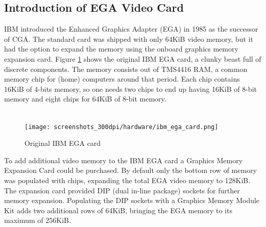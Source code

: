 \documentclass[book.tex]{subfiles}
\begin{document}
\subsection{Introduction of EGA Video Card}

IBM introduced the Enhanced Graphics Adapter (EGA) in 1985 as the successor of CGA. The standard card was shipped with only 64KiB video memory, but it had the option to expand the memory using the onboard graphics memory expansion card.
Figure \ref{fig:ibm_ega_card} shows the original IBM EGA card, a clunky beast full of discrete components. The memory consists out of TMS4416 RAM, a common memory chip for (home) computers around that period. Each chip contains 16KiB of 4-bits memory, so one needs two chips to end up having 16KiB of 8-bit memory and eight chips for 64KiB of 8-bit memory. \\

\\


\begin{figure}[H]
  \centering 
  \texttt{[image: screenshots\_300dpi/hardware/ibm\_ega\_card.png]} 
  \caption{Original IBM EGA card}
  \label{fig:ibm_ega_card}
\end{figure}

\par
To add additional video memory to the IBM EGA card a Graphics Memory Expansion Card could be purchased. By default only the bottom row of memory was populated with chips, expanding the total EGA video memory to 128KiB. The expansion card provided DIP (dual in-line package) sockets for further memory expansion. Populating the DIP sockets with a Graphics Memory Module Kit adds two additional rows of 64KiB, bringing the EGA memory to its maximum of 256KiB. \\
\end{document}
